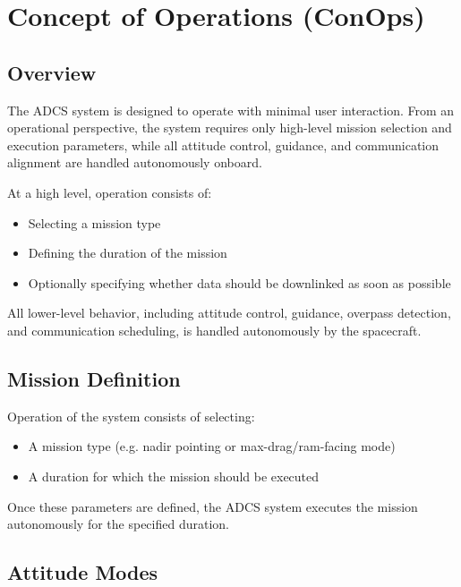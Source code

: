 \chapter{Concept of Operations (ConOps)}

\section{Overview}

The ADCS system is designed to operate with minimal user interaction. From an operational perspective, the system requires only high-level mission selection and execution parameters, while all attitude control, guidance, and communication alignment are handled autonomously onboard.

At a high level, operation consists of:

\begin{itemize}
	\item Selecting a mission type
	\item Defining the duration of the mission
	\item Optionally specifying whether data should be downlinked as soon as possible
\end{itemize}

All lower-level behavior, including attitude control, guidance, overpass detection, and communication scheduling, is handled autonomously by the spacecraft.

\section{Mission Definition}

Operation of the system consists of selecting:

\begin{itemize}
	\item A mission type (e.g. nadir pointing or max-drag/ram-facing mode)
	\item A duration for which the mission should be executed
\end{itemize}

Once these parameters are defined, the ADCS system executes the mission autonomously for the specified duration.

\section{Attitude Modes}

